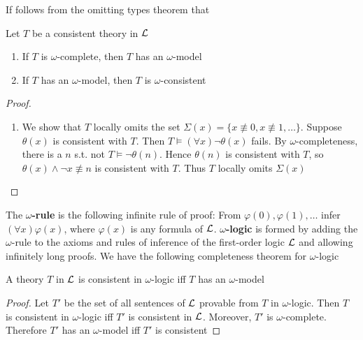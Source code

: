\documentclass[11pt]{article}
\begin{document}
If follows from the omitting types theorem that
\begin{proposition}[]
Let \(T\) be a consistent theory in \(\mathcal{L}\)
\begin{enumerate}
\item If \(T\) is \(\omega\)-complete, then \(T\) has an \(\omega\)-model
\item If \(T\) has an \(\omega\)-model, then \(T\) is \(\omega\)-consistent
\end{enumerate}
\end{proposition}

\begin{proof}
\begin{enumerate}
\item We show that \(T\) locally omits the set
\(\Sigma(x)=\{x\not\equiv0,x\not\equiv1,\dots\}\). Suppose \(\theta(x)\) is
consistent with \(T\). Then \(T\models(\forall x)\neg\theta(x)\) fails. By
\(\omega\)-completeness, there is a \(n\) s.t. not
\(T\models\neg\theta(n)\). Hence \(\theta(n)\) is consistent with \(T\), so
\(\theta(x)\wedge\neg x\not\equiv n\) is consistent with \(T\). Thus \(T\)
locally omits \(\Sigma(x)\)
\end{enumerate}
\end{proof}

The \textbf{\(\omega\)-rule} is the following infinite rule of proof: From
\(\varphi(0),\varphi(1),\dots\) infer \((\forall x)\varphi(x)\), where \(\varphi(x)\) is any formula
of \(\mathcal{L}\). \textbf{\(\omega\)-logic} is formed by adding the \(\omega\)-rule to the
axioms and rules of inference of the first-order logic \(\mathcal{L}\) and allowing
infinitely long proofs. We have the following completeness theorem for
\(\omega\)-logic

\begin{proposition}
A theory \(T\) in \(\mathcal{L}\) is consistent in \(\omega\)-logic iff \(T\) has
an \(\omega\)-model
\end{proposition}

\begin{proof}
Let \(T'\) be the set of all sentences of \(\mathcal{L}\) provable from \(T\) in
\(\omega\)-logic. Then \(T\) is consistent in \(\omega\)-logic iff \(T'\) is
consistent in \(\mathcal{L}\). Moreover, \(T'\) is \(\omega\)-complete. Therefore
\(T'\) has an \(\omega\)-model iff \(T'\) is consistent
\end{proof}
\end{document}

